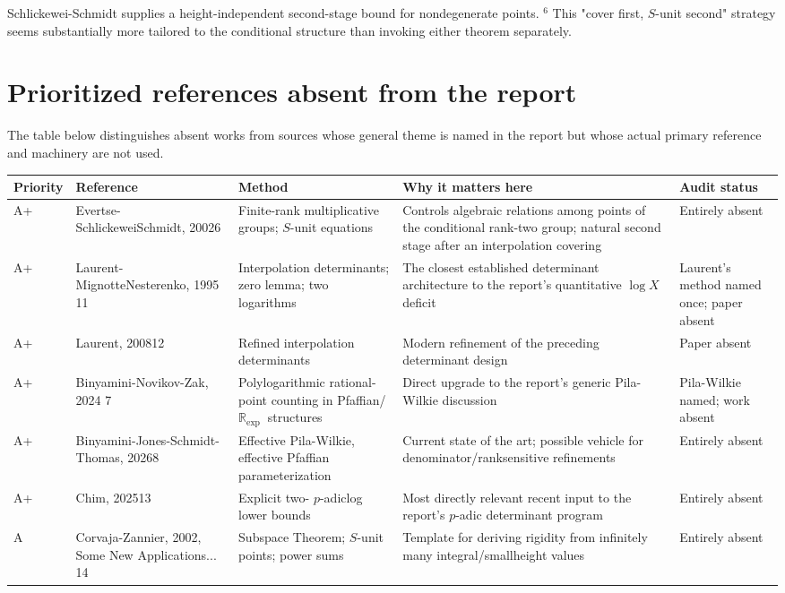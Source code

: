 \documentclass[10pt]{article}
\begin{document}
Schlickewei-Schmidt supplies a height-independent second-stage bound for nondegenerate points. ${ }^{6}$ This "cover first, $S$-unit second" strategy seems substantially more tailored to the conditional structure than invoking either theorem separately.

\section*{Prioritized references absent from the report}
The table below distinguishes absent works from sources whose general theme is named in the report but whose actual primary reference and machinery are not used.

\begin{center}
\begin{tabular}[t]{|l|l|l|l|l|}
\hline
Priority & Reference & Method & Why it matters here & Audit status \\
\hline
A+ & Evertse-SchlickeweiSchmidt, 20026 & Finite-rank multiplicative groups; $S$-unit equations & Controls algebraic relations among points of the conditional rank-two group; natural second stage after an interpolation covering & Entirely absent \\
\hline
A+ & Laurent-MignotteNesterenko, 1995 11 & Interpolation determinants; zero lemma; two logarithms & The closest established determinant architecture to the report's quantitative $\log X$ deficit & Laurent's method named once; paper absent \\
\hline
A+ & Laurent, 200812 & Refined interpolation determinants & Modern refinement of the preceding determinant design & Paper absent \\
\hline
A+ & Binyamini-Novikov-Zak, 2024 7 & Polylogarithmic rational-point counting in Pfaffian/ $\mathbb{R}_{\text {exp }}$ structures & Direct upgrade to the report's generic Pila-Wilkie discussion & Pila-Wilkie named; work absent \\
\hline
A+ & Binyamini-Jones-Schmidt-Thomas, 20268 & Effective Pila-Wilkie, effective Pfaffian parameterization & Current state of the art; possible vehicle for denominator/ranksensitive refinements & Entirely absent \\
\hline
A+ & Chim, 202513 & Explicit two- $p$-adiclog lower bounds & Most directly relevant recent input to the report's $p$-adic determinant program & Entirely absent \\
\hline
A & Corvaja-Zannier, 2002, Some New Applications... 14 & Subspace Theorem; $S$-unit points; power sums & Template for deriving rigidity from infinitely many integral/smallheight values & Entirely absent \\
\hline
\end{tabular}
\end{center}
\end{document}
